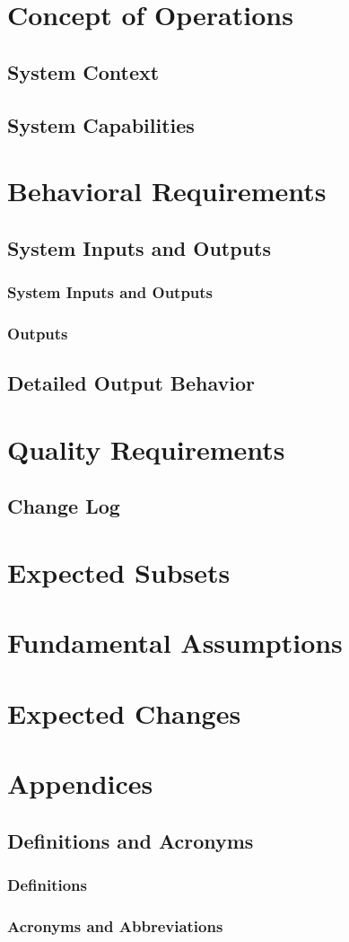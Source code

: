 \documentclass[a4paper, 11pt]{article}
\begin{document}
\section{Concept of Operations}
\subsection{System Context}
\subsection{System Capabilities}

\section{Behavioral Requirements}
\subsection{System Inputs and Outputs}
\subsubsection{System Inputs and Outputs}
\subsubsection{Outputs}
\subsection{Detailed Output Behavior}

\section{Quality Requirements}
\subsection{Change Log}
\section{Expected Subsets}

\section{Fundamental Assumptions}

\section{Expected Changes}

\section{Appendices}

\subsection{Definitions and Acronyms}
\subsubsection{Definitions}
\subsubsection{Acronyms and Abbreviations}
\end{document}
